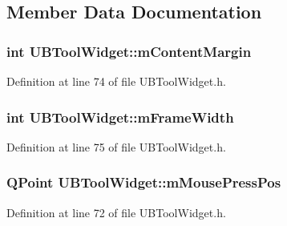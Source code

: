 \subsection{Member Data Documentation}
\hypertarget{class_u_b_tool_widget_aea71c7869e1b87efe3246327a9ab6e1b}{
\subsubsection[{m\-Content\-Margin}]{\setlength{\rightskip}{0pt plus 5cm}int U\-B\-Tool\-Widget\-::m\-Content\-Margin\hspace{0.3cm}{\ttfamily [protected]}}}\label{dc/de3/class_u_b_tool_widget_aea71c7869e1b87efe3246327a9ab6e1b}


Definition at line 74 of file U\-B\-Tool\-Widget.\-h.

\hypertarget{class_u_b_tool_widget_a080c2b025eb3bffdba9c1dc5b717ed1b}{
\subsubsection[{m\-Frame\-Width}]{\setlength{\rightskip}{0pt plus 5cm}int U\-B\-Tool\-Widget\-::m\-Frame\-Width\hspace{0.3cm}{\ttfamily [protected]}}}\label{dc/de3/class_u_b_tool_widget_a080c2b025eb3bffdba9c1dc5b717ed1b}


Definition at line 75 of file U\-B\-Tool\-Widget.\-h.

\hypertarget{class_u_b_tool_widget_a0459b98ce8907d4c8b0e5e22c8c4d5fc}{
\subsubsection[{m\-Mouse\-Press\-Pos}]{\setlength{\rightskip}{0pt plus 5cm}Q\-Point U\-B\-Tool\-Widget\-::m\-Mouse\-Press\-Pos\hspace{0.3cm}{\ttfamily [protected]}}}\label{dc/de3/class_u_b_tool_widget_a0459b98ce8907d4c8b0e5e22c8c4d5fc}


Definition at line 72 of file U\-B\-Tool\-Widget.\-h.

